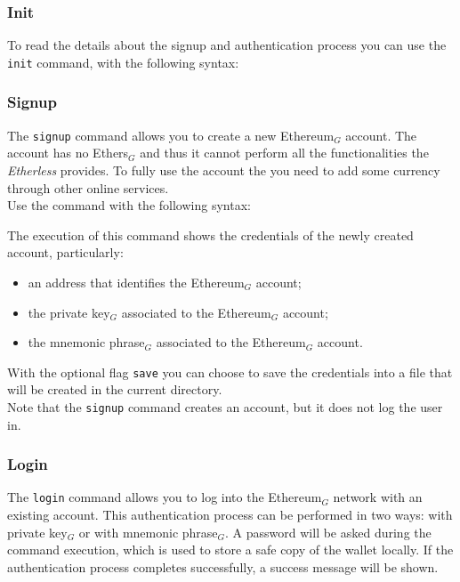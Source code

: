 \subsubsection{Init}
To read the details about the signup and authentication process you can use the \texttt{init} command, with the following syntax:
\begin{center}
\end{center}

\subsubsection{Signup}
The \texttt{signup} command allows you to create a new Ethereum$_{G}$ account. The account has no Ethers$_{G}$ and thus it cannot perform all the functionalities the \textit{Etherless} provides.
To fully use the account the you need to add some currency through other online services. \\
Use the command with the following syntax:

\begin{center}
\end{center}

\noindent The execution of this command shows the credentials of the newly created account, particularly:
\begin{itemize}
	\item an address that identifies the Ethereum$_{G}$ account;
	\item the private key$_{G}$ associated to the Ethereum$_{G}$ account;
	\item the mnemonic phrase$_{G}$ associated to the Ethereum$_{G}$ account.
\end{itemize}
With the optional flag \texttt{save} you can choose to save the credentials into a file that will be created in the current directory. \\
Note that the \texttt{signup} command creates an account, but it does not log the user in.

\subsubsection{Login}
The \texttt{login} command allows you to log into the Ethereum$_{G}$ network with an existing account.
This authentication process can be performed in two ways: with private key$_{G}$ or with mnemonic phrase$_{G}$.
A password will be asked during the command execution, which is used to store a safe copy of the wallet locally. If the authentication process completes successfully, a success message will be shown.

